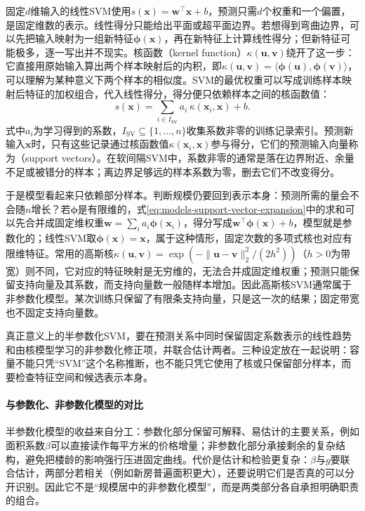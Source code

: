固定$d$维输入的线性SVM使用$s(\bm{x})=\bm{w}^{\top}\bm{x}+b$，预测只需$d$个权重和一个偏置，是固定维数的表示。线性得分只能给出平面或超平面边界。若想得到弯曲边界，可以先把输入映射为一组新特征$\bm{\phi}(\bm{x})$，再在新特征上计算线性得分；但新特征可能极多，逐一写出并不现实。核函数（kernel function）$\kappa(\bm{u},\bm{v})$绕开了这一步：它直接用原始输入算出两个样本映射后的内积，即$\kappa(\bm{u},\bm{v})=\langle\bm{\phi}(\bm{u}),\bm{\phi}(\bm{v})\rangle$，可以理解为某种意义下两个样本的相似度。SVM的最优权重可以写成训练样本映射后特征的加权组合，代入线性得分，得分便只依赖样本之间的核函数值：
\begin{equation}
  s(\bm{x})=\sum_{i\in I_{\mathrm{SV}}}
    a_i\,\kappa(\bm{x}_i,\bm{x})+b.
  \label{eq:models-support-vector-expansion}
\end{equation}
式中$a_i$为学习得到的系数，$I_{\mathrm{SV}}\subseteq\{1,\ldots,n\}$收集系数非零的训练记录索引。预测新输入$\bm{x}$时，只有这些记录通过核函数值$\kappa(\bm{x}_i,\bm{x})$参与得分，它们的预测输入向量称为（support vectors）。在软间隔SVM中，系数非零的通常是落在边界附近、余量不足或被错分的样本；离边界足够远的样本系数为零，删去它们不改变得分。

于是模型看起来只依赖部分样本。判断规模仍要回到表示本身：预测所需的量会不会随$n$增长？若$\bm{\phi}$是有限维的，式\eqref{eq:models-support-vector-expansion}中的求和可以先合并成固定维权重$\bm{w}=\sum_{i}a_i\bm{\phi}(\bm{x}_i)$，得分写成$\bm{w}^{\top}\bm{\phi}(\bm{x})+b$，模型就是参数化的；线性SVM取$\bm{\phi}(\bm{x})=\bm{x}$，属于这种情形，固定次数的多项式核也对应有限维特征。常用的高斯核$\kappa(\bm{u},\bm{v})=\exp(-\lVert\bm{u}-\bm{v}\rVert_2^2/(2h^2))$（$h>0$为带宽）则不同，它对应的特征映射是无穷维的，无法合并成固定维权重；预测只能保留支持向量及其系数，而支持向量数一般随样本增加。因此高斯核SVM通常属于非参数化模型。某次训练只保留了有限条支持向量，只是这一次的结果；固定带宽也不固定支持向量数。

真正意义上的半参数化SVM，要在预测关系中同时保留固定系数表示的线性趋势和由核模型学习的非参数化修正项，并联合估计两者。三种设定放在一起说明：容量不能只凭“SVM”这个名称推断，也不能只凭它使用了核或只保留部分样本，而要检查特征空间和候选表示本身。

\paragraph{与参数化、非参数化模型的对比}

半参数化模型的收益来自分工：参数化部分保留可解释、易估计的主要关系，例如面积系数$\beta$可以直接读作每平方米的价格增量；非参数化部分承接剩余的复杂结构，避免把楼龄的影响强行压进固定曲线。代价是估计和检验更复杂：$\beta$与$g$要联合估计，两部分若相关（例如新房普遍面积更大），还要说明它们是否真的可以分开识别。因此它不是“规模居中的非参数化模型”，而是两类部分各自承担明确职责的组合。

